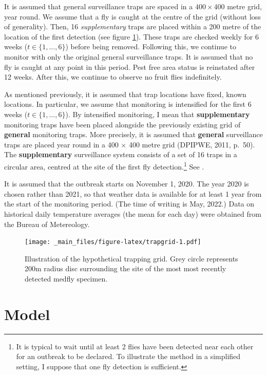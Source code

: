 \documentclass[
  oneside]{book}
\begin{document}
It is assumed that general surveillance traps are spaced in a \(400 \times 400\) metre grid, year round. We assume that a fly is caught at the centre of the grid (without loss of generality). Then, 16 \emph{supplementary} traps are placed within a 200 metre of the location of the first detection (see figure \ref{fig:trapgrid}). These traps are checked weekly for 6 weeks (\(t \in \{1, \ldots, 6\}\)) before being removed. Following this, we continue to monitor with only the original general surveillance traps. It is assumed that no fly is caught at any point in this period. Pest free area status is reinstated after 12 weeks. After this, we continue to observe no fruit flies indefinitely.

As mentioned previously, it is assumed that trap locations have fixed, known locations. In particular, we assume that monitoring is intensified for the first 6 weeks (\(t \in \{1, \ldots, 6\}\)). By intensified monitoring, I mean that \textbf{supplementary} monitoring traps have been placed alongside the previously existing grid of \textbf{general} monitoring traps. More precisely, it is assumed that \textbf{general} surveillance traps are placed year round in a 400 \(\times\) 400 metre grid (DPIPWE, 2011, p.~50). The \textbf{supplementary} surveillance system consists of a set of 16 traps in a circular area, centred at the site of the first fly detection.\footnote{It is typical to wait until at least 2 flies have been detected near each other for an outbreak to be declared. To illustrate the method in a simplified setting, I suppose that one fly detection is sufficient.} See \citet{trapgrid}.

It is assumed that the outbreak starts on November 1, 2020. The year 2020 is chosen rather than 2021, so that weather data is available for at least 1 year from the start of the monitoring period. (The time of writing is May, 2022.) Data on historical daily temperature averages (the mean for each day) were obtained from the Bureau of Metereology.

\begin{figure}
\centering
\texttt{[image: \_main\_files/figure-latex/trapgrid-1.pdf]}
\caption{\label{fig:trapgrid}Illustration of the hypothetical trapping grid. Grey circle represents 200m radius disc surrounding the site of the most most recently detected medfly specimen.}
\end{figure}

\hypertarget{model}{%
\section{Model}\label{model}}
\end{document}
